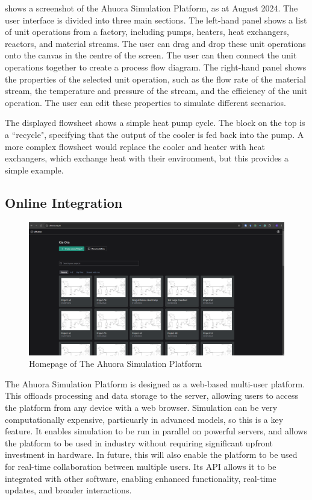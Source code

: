 \documentclass[12pt]{report}
\begin{document}
 shows a screenshot of the Ahuora Simulation Platform, as at August 2024. The user interface is divided into three main sections. The left-hand panel shows a list of unit operations from a factory, including pumps, heaters, heat exchangers, reactors, and material streams. The user can drag and drop these unit operations onto the canvas in the centre of the screen. The user can then connect the unit operations together to create a process flow diagram. The right-hand panel shows the properties of the selected unit operation, such as the flow rate of the material stream, the temperature and pressure of the stream, and the efficiency of the unit operation. The user can edit these properties to simulate different scenarios.

The displayed flowsheet shows a simple heat pump cycle. The block on the top is a ``recycle", specifying that the output of the cooler is fed back into the pump. A more complex flowsheet would replace the cooler and heater with heat exchangers, which exchange heat with their environment, but this provides a simple example.

\subsection{Online Integration}

\begin{figure}
    \centering
    \includegraphics[width=\textwidth]{platform_homepage.png}
    \caption{Homepage of The Ahuora Simulation Platform}
    \label{fig:homepage}
\end{figure}

The Ahuora Simulation Platform is designed as a web-based multi-user platform. This offloads processing and data storage to the server, allowing users to access the platform from any device with a web browser. Simulation can be very computationally expensive, particuarly in advanced models, so this is a key feature. It enables simulation to be run in parallel on powerful servers, and allows the platform to be used in industry without requiring significant upfront investment in hardware. In future, this will also enable the platform to be used for real-time collaboration between multiple users. Its API allows it to be integrated with other software, enabling enhanced functionality, real-time updates, and broader interactions.
\end{document}
